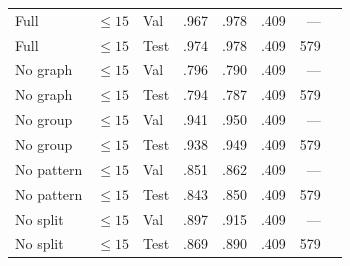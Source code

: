 \documentclass[10pt,a4paper]{article}
\newcommand{\na}{---}
\begin{document}
\begin{center}
{\begin{tabular}{lllrrrrr}
\midrule
Full       & $\leq15$ & Val  & .967 & .978 & .409 & \na \\
Full       & $\leq15$ & Test & .974 & .978 & .409 & 579 \\
No graph   & $\leq15$ & Val  & .796 & .790 & .409 & \na \\
No graph   & $\leq15$ & Test & .794 & .787 & .409 & 579 \\
No group   & $\leq15$ & Val  & .941 & .950 & .409 & \na \\
No group   & $\leq15$ & Test & .938 & .949 & .409 & 579 \\
No pattern & $\leq15$ & Val  & .851 & .862 & .409 & \na \\
No pattern & $\leq15$ & Test & .843 & .850 & .409 & 579 \\
No split   & $\leq15$ & Val  & .897 & .915 & .409 & \na \\
No split   & $\leq15$ & Test & .869 & .890 & .409 & 579 \\
\bottomrule
\end{tabular}}
\end{center}
\end{document}
